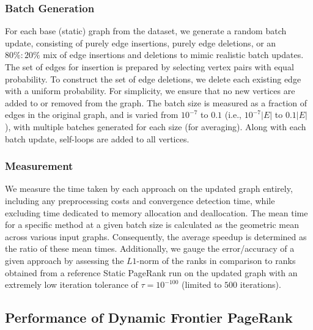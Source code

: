


\subsubsection{Batch Generation}
\label{sec:batch-generation}

For each base (static) graph from the dataset, we generate a random batch update, consisting of purely edge insertions, purely edge deletions, or an $80\% : 20\%$ mix of edge insertions and deletions to mimic realistic batch updates. The set of edges for insertion is prepared by selecting vertex pairs with equal probability. To construct the set of edge deletions, we delete each existing edge with a uniform probability. For simplicity, we ensure that no new vertices are added to or removed from the graph. The batch size is measured as a fraction of edges in the original graph, and is varied from $10^{-7}$ to $0.1$ (i.e., $10^{-7}|E|$ to $0.1|E|$), with multiple batches generated for each size (for averaging). Along with each batch update, self-loops are added to all vertices.


\subsubsection{Measurement}
\label{sec:measurement}

We measure the time taken by each approach on the updated graph entirely, including any preprocessing costs and convergence detection time, while excluding time dedicated to memory allocation and deallocation. The mean time for a specific method at a given batch size is calculated as the geometric mean across various input graphs. Consequently, the average speedup is determined as the ratio of these mean times. Additionally, we gauge the error/accuracy of a given approach by assessing the $L1$-norm \cite{ohsaka2015efficient} of the ranks in comparison to ranks obtained from a reference Static PageRank run on the updated graph with an extremely low iteration tolerance of $\tau = 10^{-100}$ (limited to $500$ iterations).















\subsection{Performance of Dynamic Frontier PageRank}

